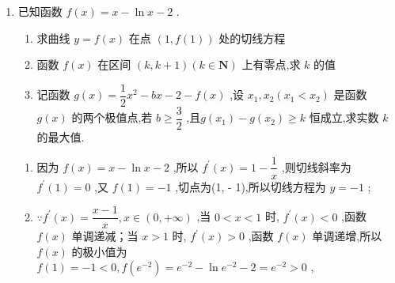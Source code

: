 \begin{enumerate}
\begin{enumerate}
\begin{jieda}
\begin{enumerate}
                令 $g\left( x\right)  = \dfrac{x}{{{e}}^{x}}\left( {x >  - 1}\right)$ ，则 ${g}^{\prime }\left( x\right)  = \dfrac{1 - x}{{{e}}^{x}}$ ，
                
                当 $- 1 < x < 1$ 时， ${g}^{\prime }\left( x\right)  > 0$ ，即 $g\left( x\right)$ 在区间 $\left( {-1,1}\right)$ 上单调递增，
                
                当 $x > 1$ 时， ${g}^{\prime }\left( x\right)  < 0$ ，即 $g\left( x\right)$ 在区间 $\left( {1, + \infty }\right)$ 上单调递减，所以 $g\left( x\right)  \leq  g\left( 1\right)  = \dfrac{1}{{e}}$ ，
                
                得到 ${2a} > \dfrac{1}{{e}}$ ,所以 $a > \dfrac{1}{2{e}}$ ,故 $a$ 的取值范围为 $\left( {\dfrac{1}{2{e}}, + \infty }\right)$ .
            \end{enumerate}
        \end{jieda}
        \item 已知函数 $f\left( x\right)  = x - \ln x - 2$ .
        \begin{enumerate}
            \item 求曲线 $y = f\left( x\right)$ 在点 $\left( {1,f\left( 1\right) }\right)$ 处的切线方程
            \item 函数 $f\left( x\right)$ 在区间 $\left( {k,k + 1}\right) \left( {k \in  \mathbf{N}}\right)$ 上有零点,求 $k$ 的值
            \item 记函数 $g\left( x\right)  = \dfrac{1}{2}{x}^{2} - {bx} - 2 - f\left( x\right)$ ,设 ${x}_{1},{x}_{2}\left( {{x}_{1} < {x}_{2}}\right)$ 是函数 $g\left( x\right)$ 的两个极值点,若 $b \geq  \dfrac{3}{2}$ ,且$g\left( {x}_{1}\right)  - g\left( {x}_{2}\right)  \geq  k$ 恒成立,求实数 $k$ 的最大值.
        \end{enumerate}
        \begin{jieda}
            \begin{enumerate}
                \item 因为 $f\left( x\right)  = x - \ln x - 2$ ,所以 ${f}^{\prime }\left( x\right)  = 1 - \dfrac{1}{x}$ ,则切线斜率为 ${f}^{\prime }\left( 1\right)  = 0$ ,又 $f\left( 1\right)  =  - 1$ ,切点为(1, - 1),所以切线方程为 $y =  - 1$ ;
                \item $\because {f}^{\prime }\left( x\right)  = \dfrac{x - 1}{x},x \in  \left( {0, + \infty }\right)$ ,当 $0 < x < 1$ 时, ${f}^{\prime }\left( x\right)  < 0$ ,函数 $f\left( x\right)$ 单调递减；当 $x > 1$ 时, ${f}^{\prime }\left( x\right)  > 0$ ,函数 $f\left( x\right)$ 单调递增,所以 $f\left( x\right)$ 的极小值为 $f\left( 1\right)  =  - 1 < 0,f\left( {{e}}^{-2}\right)  = {{e}}^{-2} - \ln {{e}}^{-2} - 2 = {{e}}^{-2} > 0$ ,

\end{enumerate}
\end{jieda}
\end{enumerate}
\end{enumerate}
